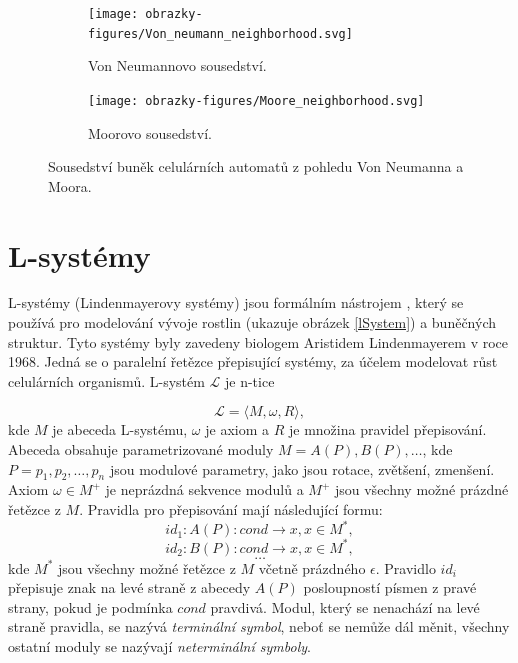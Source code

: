 \begin{figure}[h]
	\centering
	\begin{subfigure}{0.475\textwidth}
		\centering
		\texttt{[image: obrazky-figures/Von\_neumann\_neighborhood.svg]}
		\caption{Von Neumannovo sousedství.}
		\label{vonNeumann}
	\end{subfigure}
	\begin{subfigure}{0.475\textwidth}
		\centering
		\texttt{[image: obrazky-figures/Moore\_neighborhood.svg]}
		\caption{Moorovo sousedství.}
		\label{moore}
	\end{subfigure}
	\caption{Sousedství buněk celulárních automatů z pohledu Von Neumanna a Moora.}
\end{figure}

\section{L-systémy}
\label{lsystems}
L-systémy (Lindenmayerovy systémy) jsou formálním nástrojem \cite{prusinkiewicz1986graphical}, který se používá pro modelování vývoje rostlin (ukazuje obrázek \ref{lSystem}) a buněčných struktur. Tyto systémy byly zavedeny biologem Aristidem Lindenmayerem v roce 1968. \cite{inverseL-systems} Jedná se o paralelní řetězce přepisující systémy, za účelem modelovat růst celulárních organismů. L-systém $\mathcal{L}$ je n-tice

\begin{equation}
	\mathcal{L} = \langle M,\omega,R\rangle ,
\end{equation}
kde $M$ je abeceda L-systému, $\omega$ je axiom a $R$ je množina pravidel přepisování. Abeceda obsahuje parametrizované moduly $M = {A(P),B(P),\ldots}$, kde $P=p_1,p_2,\ldots,p_n$ jsou modulové parametry, jako jsou rotace, zvětšení, zmenšení.
Axiom $\omega \in M^+$ je neprázdná sekvence modulů a $M^+$ jsou všechny možné prázdné řetězce z $M$. Pravidla pro přepisování mají následující formu:
\begin{equation}
id_1:A(P):cond\rightarrow x,x \in M^*,
\end{equation}
\begin{equation}
id_2:B(P):cond\rightarrow x,x \in M^*,
\end{equation}
\[\ldots\]
kde $M^*$ jsou všechny možné řetězce z $M$ včetně prázdného $\epsilon$. Pravidlo $id_i$ přepisuje znak na levé straně z abecedy $A(P)$ posloupností písmen z pravé strany, pokud je podmínka $cond$ pravdivá. Modul, který se nenachází na levé straně pravidla, se nazývá \textit{terminální symbol}, neboť se nemůže dál měnit, všechny ostatní moduly se nazývají \textit{neterminální symboly}.~\cite{prusinkiewicz2012algorithmic}

